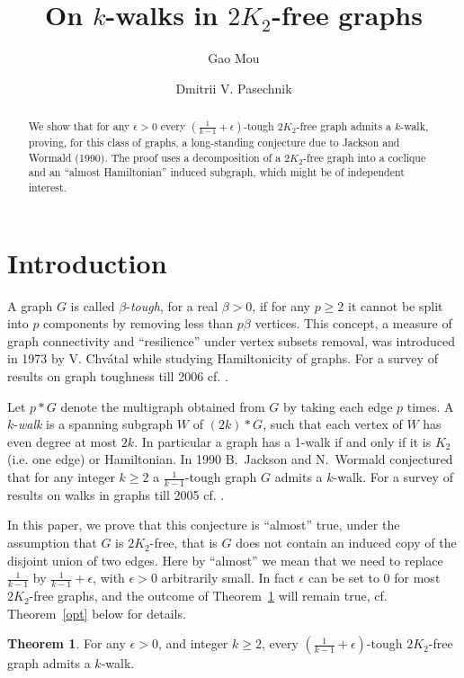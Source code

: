 \documentclass{amsart}
\theoremstyle{definition}
\newtheorem{theorem}{Theorem}
\begin{document}
\author{Gao Mou}
\address{School of Physical and Mathematical Sciences, Nanyang Technological University, Singapore} 
\author{Dmitrii V. Pasechnik}
\address{Department of Computer Science, The University of Oxford, UK}

\title{On $k$-walks in $2K_2$-free graphs}
\begin{abstract}
We show that for any $\epsilon>0$ every $(\frac{1}{k-1}+\epsilon)$-tough
$2K_2$-free graph admits a $k$-walk, proving, for this class of graphs, a
long-standing conjecture due to Jackson and Wormald (1990). The proof uses a
decomposition of a $2K_2$-free graph into a coclique and an ``almost Hamiltonian''
induced subgraph, which might be of independent interest.
\end{abstract}

\maketitle

\section{Introduction}
A graph $G$ is called $\beta$-{\em tough}, for a real $\beta>0$, if for any $p\geq 2$ it
cannot be split into $p$ components by removing less than $p\beta$ vertices.  
This concept, a measure of graph connectivity and ``resilience'' under vertex subsets removal,
was introduced in 1973 by V. Chv\'{a}tal 
while studying   Hamiltonicity of graphs. For a survey of results on graph toughness till 2006
cf. \cite{MR2221006}.

Let $p*G$ denote the multigraph obtained from $G$ by taking each edge $p$ times. 
A $k$-{\em walk} is a spanning subgraph $W$ of $(2k)*G$, such that each vertex of $W$ 
has even degree at most $2k$. %
In particular a graph has a 1-walk if and only if it is $K_2$ (i.e. one edge) or Hamiltonian.
In 1990 B.~Jackson and N.~Wormald conjectured \cite{jackson1990k} that for any integer $k\ge2$ a
$\frac{1}{k-1}$-tough graph $G$ admits a $k$-walk.
{For a survey of results on walks in graphs till 2005 cf. \cite{kouider2005connected}.}

In this paper, we prove that this conjecture is ``almost'' true, under the
assumption that $G$ is  $2K_2$-free, that is $G$ does not contain an induced
copy of the disjoint union of two edges.  Here by ``almost'' we
mean that we need to replace $\frac{1}{k-1}$ by
$\frac{1}{k-1}+\epsilon$, with $\epsilon>0$ arbitrarily small.  In fact
$\epsilon$ can be set to 0 for most $2K_2$-free graphs, and the outcome of
Theorem~\ref{thm2} will remain true, cf. Theorem~\ref{opt} below for details.
\begin{theorem}\label{thm2} 
For any $\epsilon>0$, and integer $k\ge2$, every
$\left(\frac{1}{k-1}+\epsilon\right)$-tough $2K_2$-free graph admits a $k$-walk.
\end{theorem}
\end{document}
